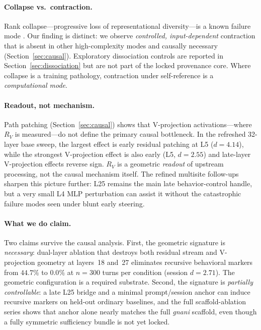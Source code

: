 \documentclass{article}
\newcommand{\RV}{R_V}
\newcommand{\dcohen}{d}
\begin{document}
\paragraph{Collapse vs.\ contraction.}
Rank collapse---progressive loss of representational diversity---is a known failure mode
\citep{noci2022signal, dong2021attention, hong2024variance, giorlandino2025two}.
Our finding is distinct: we observe \emph{controlled, input-dependent} contraction that is
absent in other high-complexity modes and causally necessary (Section~\ref{sec:causal}).
Exploratory dissociation controls are reported in Section~\ref{sec:dissociation} but are not part
of the locked provenance core.
Where collapse is a training pathology, contraction under self-reference is a
\emph{computational mode}.

\paragraph{Readout, not mechanism.}
Path patching (Section~\ref{sec:causal}) shows that V-projection activations---where
$\RV$ is measured---do not define the primary causal bottleneck.
In the refreshed 32-layer base sweep, the largest effect is early residual patching at L5
($\dcohen = 4.14$), while the strongest V-projection effect is also early (L5, $\dcohen = 2.55$)
and late-layer V-projection effects reverse sign.
$\RV$ is a geometric \emph{readout} of upstream processing, not the causal mechanism itself.
The refined multisite follow-ups sharpen this picture further: L25 remains the main late
behavior-control handle, but a very small L4 MLP perturbation can assist it without the
catastrophic failure modes seen under blunt early steering.

\paragraph{What we do claim.}
Two claims survive the causal analysis.
First, the geometric signature is \emph{necessary}: dual-layer ablation that destroys both residual
stream and V-projection geometry at layers~18 and~27 eliminates recursive behavioral markers
from $44.7\%$ to $0.0\%$ at $n{=}300$ turns per condition (session $\dcohen = 2.71$).
The geometric configuration is a required substrate.
Second, the signature is \emph{partially controllable}: a late L25 bridge and a minimal prompt/session
anchor can induce recursive markers on held-out ordinary baselines, and the full scaffold-ablation
series shows that anchor alone nearly matches the full \emph{gnani} scaffold, even though a fully
symmetric sufficiency bundle is not yet locked.
\end{document}
